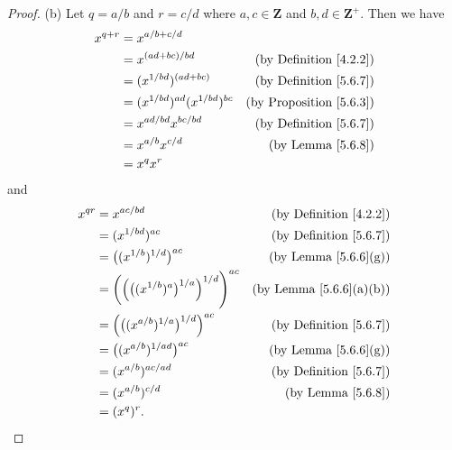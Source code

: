 \begin{proof}{(b)}
    Let \(q = a / b\) and \(r = c / d\) where \(a, c \in \mathbf{Z}\) and \(b, d \in \mathbf{Z}^+\).
    Then we have
    \begin{align*}
        x^{q + r} & = x^{a / b + c / d}                                                         \\
                  & = x^{(ad + bc) / bd}                  & \text{(by Definition \ref{4.2.2})}  \\
                  & = (x^{1 / bd})^{(ad + bc)}            & \text{(by Definition \ref{5.6.7})}  \\
                  & = (x^{1 / bd})^{ad} (x^{1 / bd})^{bc} & \text{(by Proposition \ref{5.6.3})} \\
                  & = x^{ad / bd} x^{bc / bd}             & \text{(by  Definition \ref{5.6.7})} \\
                  & = x^{a / b} x^{c / d}                 & \text{(by Lemma \ref{5.6.8})}       \\
                  & = x^q x^r
    \end{align*}
    and
    \begin{align*}
        x^{qr} & = x^{ac / bd}                                                        & \text{(by Definition \ref{4.2.2})}  \\
               & = (x^{1 / bd})^{ac}                                                  & \text{(by Definition \ref{5.6.7})}  \\
               & = \big((x^{1 / b})^{1 / d}\big)^{ac}                                 & \text{(by Lemma \ref{5.6.6}(g))}    \\
               & = \bigg(\Big(\big((x^{1 / b})^a\big)^{1 / a}\Big)^{1 / d}\Bigg)^{ac} & \text{(by Lemma \ref{5.6.6}(a)(b))} \\
               & = \Big(\big((x^{a / b})^{1 / a}\big)^{1 / d}\Big)^{ac}               & \text{(by Definition \ref{5.6.7})}  \\
               & = \big((x^{a / b})^{1 / ad}\big)^{ac}                                & \text{(by Lemma \ref{5.6.6}(g))}    \\
               & = (x^{a / b})^{ac / ad}                                              & \text{(by Definition \ref{5.6.7})}  \\
               & = (x^{a / b})^{c / d}                                                & \text{(by Lemma \ref{5.6.8})}       \\
               & = (x^q)^r.
    \end{align*}
\end{proof}

